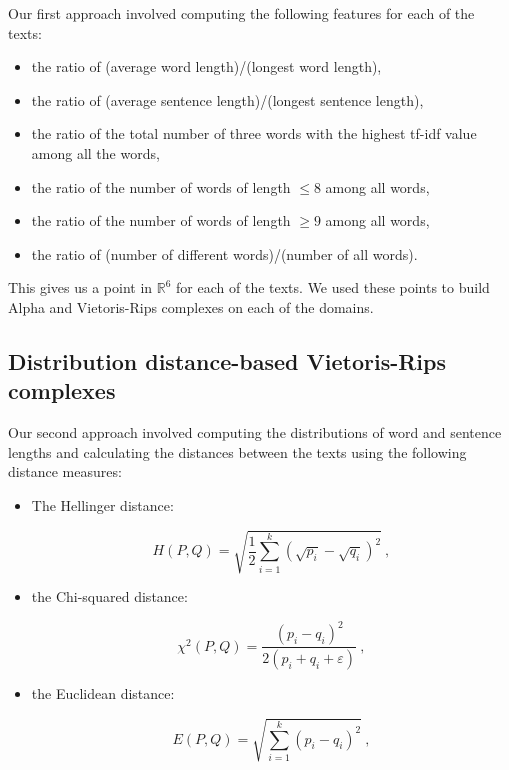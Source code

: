 \documentclass[12pt,a4paper]{amsart}
\def\R{\mathbb R}
\begin{document}
Our first approach involved computing the following features for each of the
texts:

\begin{itemize}
  \item the ratio of (average word length)/(longest word length),
  \item the ratio of (average sentence length)/(longest sentence length),
  \item the ratio of the total number of three words with the highest tf-idf
    value among all the words,
  \item the ratio of the number of words of length $\le 8$ among all words,
  \item the ratio of the number of words of length $\ge 9$ among all words,
  \item the ratio of (number of different words)/(number of all words).
\end{itemize}

This gives us a point in $\R^6$ for each of the texts. We used these points to
build Alpha and Vietoris-Rips complexes on each of the domains.

\subsection{Distribution distance-based Vietoris-Rips complexes}

Our second approach involved computing the distributions of word and sentence
lengths and calculating the distances between the texts using the following
distance measures:

\begin{itemize}
\item The Hellinger distance:

\begin{equation*}
  H(P,Q) = \sqrt{\frac{1}{2} \sum_{i=1}^k\left(\sqrt{p_i} -
    \sqrt{q_i}\right)^2}\ ,
\end{equation*}

\item the Chi-squared distance:

\begin{equation*}
  \chi^2(P,Q) = \frac{(p_i - q_i)^2}{2(p_i + q_i + \varepsilon)}\ ,
\end{equation*}

\item the Euclidean distance:

\begin{equation*}
  E(P,Q) = \sqrt{\sum_{i=1}^k\left(p_i - q_i\right)^2}\ ,
\end{equation*}
\end{itemize}
\end{document}
